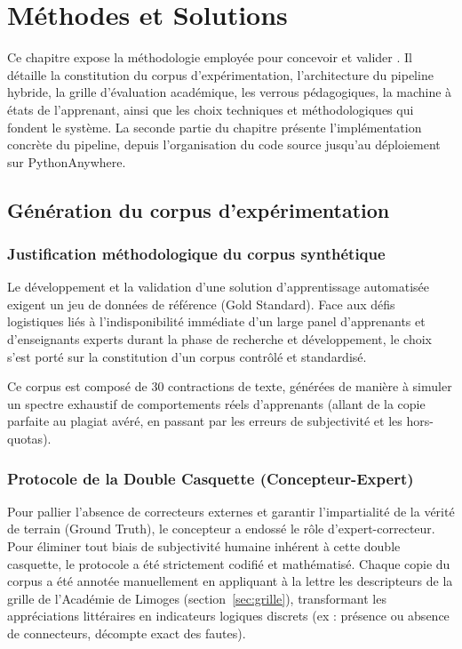 \chapter{Méthodes et Solutions}
\label{ch:methodo}

Ce chapitre expose la méthodologie employée pour concevoir et valider \AZIZA. Il détaille la constitution du corpus d'expérimentation, l'architecture du pipeline hybride, la grille d'évaluation académique, les verrous pédagogiques, la machine à états de l'apprenant, ainsi que les choix techniques et méthodologiques qui fondent le système. La seconde partie du chapitre présente l'implémentation concrète du pipeline, depuis l'organisation du code source jusqu'au déploiement sur PythonAnywhere.

\section{Génération du corpus d'expérimentation}
\label{sec:generation-corpus}

\subsection{Justification méthodologique du corpus synthétique}

Le développement et la validation d'une solution d'apprentissage automatisée exigent un jeu de données de référence (Gold Standard). Face aux défis logistiques liés à l'indisponibilité immédiate d'un large panel d'apprenants et d'enseignants experts durant la phase de recherche et développement, le choix s'est porté sur la constitution d'un corpus contrôlé et standardisé.

Ce corpus est composé de 30 contractions de texte, générées de manière à simuler un spectre exhaustif de comportements réels d'apprenants (allant de la copie parfaite au plagiat avéré, en passant par les erreurs de subjectivité et les hors-quotas).

\subsection{Protocole de la \guillemotleft{}Double Casquette\guillemotright{} (Concepteur-Expert)}

Pour pallier l'absence de correcteurs externes et garantir l'impartialité de la vérité de terrain (Ground Truth), le concepteur a endossé le rôle d'expert-correcteur. Pour éliminer tout biais de subjectivité humaine inhérent à cette double casquette, le protocole a été strictement codifié et mathématisé. Chaque copie du corpus a été annotée manuellement en appliquant à la lettre les descripteurs de la grille de l'Académie de Limoges (section~\ref{sec:grille}), transformant les appréciations littéraires en indicateurs logiques discrets (ex : présence ou absence de connecteurs, décompte exact des fautes).

